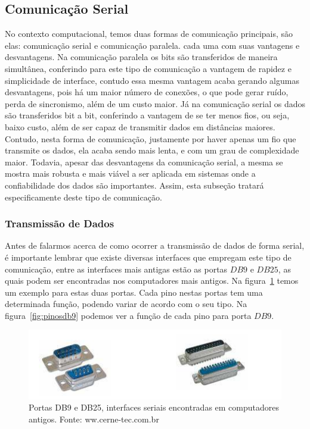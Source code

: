 \documentclass[12pt]{article}
\begin{document}
\subsection{Comunicação Serial}
No contexto computacional, temos duas formas de comunicação principais, são elas: comunicação serial e comunicação paralela. cada uma com suas vantagens e desvantagens. Na comunicação paralela os bits são transferidos de maneira simultânea, conferindo para este tipo de comunicação a vantagem de rapidez e simplicidade de interface, contudo essa mesma vantagem acaba gerando algumas desvantagens, pois há um maior número de conexões, o que pode gerar ruído, perda de sincronismo, além de um custo maior. Já na comunicação serial os dados são transferidos  bit a bit, conferindo a vantagem de se ter menos fios, ou seja, baixo custo, além de ser capaz de transmitir dados em distâncias maiores. Contudo, nesta forma de comunicação, justamente por haver apenas um fio que transmite os dados, ela acaba sendo mais lenta, e com um grau de complexidade maior. Todavia, apesar das desvantagens da comunicação serial, a mesma se mostra mais robusta e mais viável a ser aplicada em sistemas onde a confiabilidade dos dados são importantes. Assim, esta subseção tratará especificamente deste tipo de comunicação. 

\subsubsection{Transmissão de Dados}
Antes de falarmos acerca de como ocorrer a transmissão de dados de forma serial, é importante lembrar que existe diversas interfaces que empregam este tipo de comunicação, entre as interfaces mais antigas estão as portas $DB9$ e $DB25$, as quais podem ser encontradas nos computadores mais antigos. Na figura~\ref{fig:db9db25} temos um exemplo para estas duas portas. Cada pino nestas portas tem uma determinada função, podendo variar de acordo com o seu tipo. Na  figura~\ref{fig:pinosdb9} podemos ver a função de cada pino para porta $DB9$.


\begin{figure}[h]
\centering
\includegraphics[width=.5\textwidth]{img/fig8DB9DB25.png}
\caption{Portas DB9 e DB25, interfaces seriais encontradas em computadores antigos. Fonte: ww.cerne-tec.com.br}
\label{fig:db9db25}
\end{figure}
\end{document}
